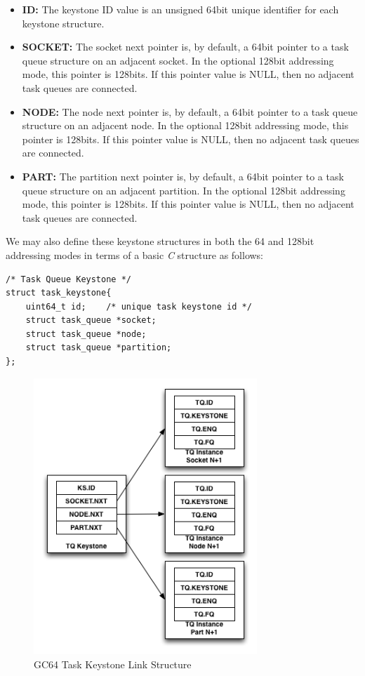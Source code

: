 \documentclass{article}
\begin{document}
\begin{itemize}
\item \textbf{ID:} The keystone ID value is an unsigned 64bit unique identifier for each keystone structure.  
\item \textbf{SOCKET:} The socket next pointer is, by default, a 64bit pointer to a task queue structure on an adjacent socket.  In the optional 128bit addressing mode, this pointer is 128bits.  If this pointer value is NULL, then no adjacent task queues are connected.  
\item \textbf{NODE:} The node next pointer is, by default, a 64bit pointer to a task queue structure on an adjacent node.  In the optional 128bit addressing mode, this pointer is 128bits.  If this pointer value is NULL, then no adjacent task queues are connected.  
\item \textbf{PART:} The partition next pointer is, by default, a 64bit pointer to a task queue structure on an adjacent partition.  In the optional 128bit addressing mode, this pointer is 128bits.  If this pointer value is NULL, then no adjacent task queues are connected.  
\end{itemize}  

We may also define these keystone structures in both the 64 and 128bit addressing modes in terms of a basic \emph{C} structure as follows: 

\begin{verbatim}
/* Task Queue Keystone */
struct task_keystone{
	uint64_t id;	/* unique task keystone id */
	struct task_queue *socket;
	struct task_queue *node;
	struct task_queue *partition;
};
\end{verbatim}

\begin{figure}[h!]
\begin{center}
\includegraphics[width=0.75\textwidth]{gc64-keystone.png}
\caption{GC64 Task Keystone Link Structure}
\end{center}
\label{figure:taskkeystone}
\end{figure} 
\end{document}
